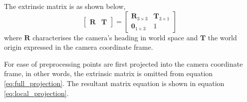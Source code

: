         The extrinsic matrix is as shown below,
        \begin{equation}\label{eq:extrinsic}
            \begin{bmatrix}
                \bm{R} & \bm{T}
            \end{bmatrix}
            =
            \begin{bmatrix}
                \bm{R}_{3\times3} & \bm{T}_{3\times1} \\
                \bm{0}_{1\times3} & 1
            \end{bmatrix}
        \end{equation}
        where \(\bm{R}\) characterises the camera's heading in world space and \(\bm{T}\) the world origin expressed in 
        the camera coordinate frame.

        For ease of preprocessing points are first projected into the camera coordinate frame, in other words, the extrinsic matrix is omitted from equation \ref{eq:full_projection}.
        The resultant matrix equation is shown in equation \ref{eq:local_projection}.

